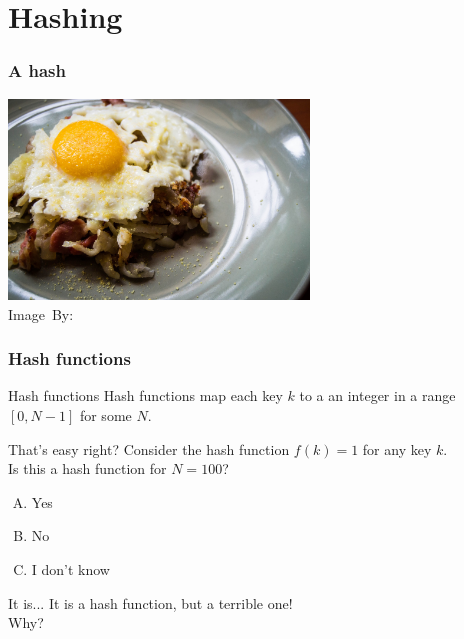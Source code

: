 \section{Hashing}%
\label{sec:hashing}

\begin{frame}
	\frametitle{A hash}
\begin{center}
	\includegraphics[width=0.6\textwidth]{figures/hash.jpg}\\
	\hspace*{15pt}\hbox{\scriptsize Image By:}
\end{center}
\end{frame}

\begin{frame}
	\frametitle{Hash functions}
	
		\begin{block}{Hash functions}
			Hash functions map each key $k$ to a an integer in a range $[0, N-1]$ for some $N$.\\
		\end{block}	
		\pause
		\begin{questionblock}{That's easy right?}
			Consider the hash function $f(k) = 1$ for any key $k$.\\
			Is this a hash function for $N=100$?
			\begin{enumerate}[A.]
				\item Yes
				\item No
				\item I don't know
			\end{enumerate}
		\end{questionblock}

		\pause
			\begin{alertblock}{It is...}
				It is a hash function, but a terrible one!\\
				Why?
			\end{alertblock}	
\end{frame}

